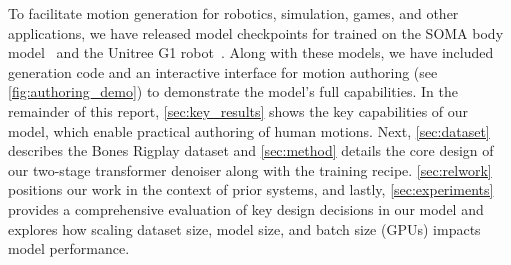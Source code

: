 To facilitate motion generation for robotics, simulation, games, and other applications, we have released model checkpoints for \model trained on the SOMA body model~\cite{saito2026soma} and the Unitree G1 robot~\cite{unitree2024g1}. Along with these models, we have included generation code and an interactive interface for motion authoring (see \cref{fig:authoring_demo}) to demonstrate the model's full capabilities. 
In the remainder of this report, \cref{sec:key_results} shows the key capabilities of our model, which enable practical authoring of human motions. 
Next, \cref{sec:dataset} describes the Bones Rigplay dataset and \cref{sec:method} details the core design of our two-stage transformer denoiser along with the training recipe. 
\cref{sec:relwork} positions our work in the context of prior systems, and lastly, \cref{sec:experiments} provides a comprehensive evaluation of key design decisions in our model and explores how scaling dataset size, model size, and batch size (GPUs) impacts model performance.